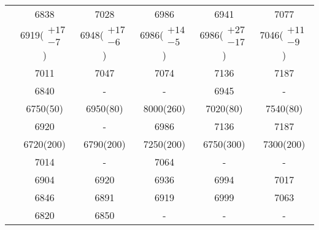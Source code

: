 \documentclass[showkeys,aps,10pt,twocolumn,showpacs,preprintnumbers,amsmath,amssymb,prd,letterpaper,floatfix,nofootinbib,superscriptaddress,]{revtex4-1}
\begin{document}
\begin{tabular}{cccccc}
\cite{He:2004px}                        &        6838              &          7028             &           6986              &          6941            &        7077             \\
\cite{Albertus:2006ya}                  &     6919($\substack{+17 \\ -7}$)   &  6948($\substack{+17 \\ -6}$) & 6986($\substack{+14 \\ -5}$) &  6986($\substack{+27 \\ -17}$)  &  7046($\substack{+11 \\ -9}$) \\
\cite{Roberts:2007ni}                   &        7011              &          7047             &           7074              &          7136            &        7187             \\
\cite{Weng:2010rb}                      &        6840              &            -              &             -               &          6945            &          -              \\ 
\cite{Zhang:2008rt}                     &        6750(50)          &          6950(80)         &           8000(260)         &          7020(80)        &        7540(80)         \\
\cite{Shah:2016vmd,Shah:2017liu}        &        6920              &          -                &           6986              &          7136            &        7187             \\
\cite{Aliev:2012ru,Aliev:2012iv}        &        6720(200)         &          6790(200)        &           7250(200)         &          6750(300)       &        7300(200)        \\
\cite{Eakins:2012jk}                    &        7014              &          -                &           7064              &          -               &        -                \\
\cite{Giannuzzi:2009gh}                 &        6904              &          6920             &           6936              &          6994            &        7017             \\
\cite{Bernotas:2008fv}                  &        6846              &          6891             &           6919              &          6999            &        7063             \\
\cite{Gershtein:2000nx}                 &        6820              &          6850             &             -               &          -               &          -              \\

\end{tabular}
\end{document}
